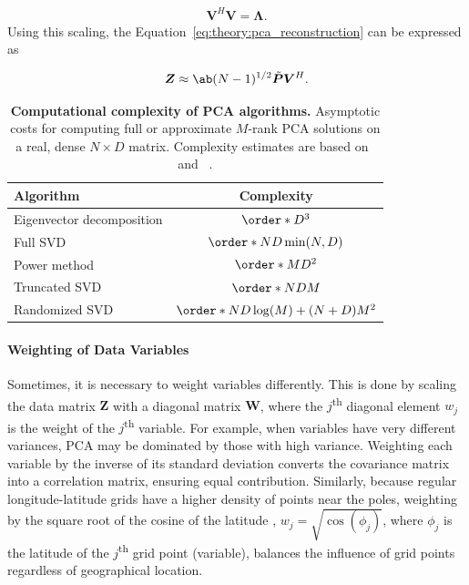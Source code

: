 \begin{align}\label{eq:theory:pca_loadings_non_orthogonal}
    \bm{V}^H \bm{V} = \bm{\Lambda}.
\end{align}
Using this scaling, the Equation~\ref{eq:theory:pca_reconstruction} can be expressed as

\begin{align}\label{eq:theory:pca_reconstruction_loadings}
    \bm{Z} \approx \ab(N-1)^{1/2} \bmn{P} \bm{V}^H.
\end{align}


\begin{table}
    \caption[Computational complexity of PCA algorithms]{\textbf{Computational complexity of PCA algorithms.} Asymptotic costs for computing full or approximate $M$-rank PCA solutions on a real, dense $N\times D$ matrix. Complexity estimates are based on~\citet{bishop_pattern_2006} and ~\citet{halko_finding_2011}.}
    \centering
    \label{tab:pca_algorithm_complexity}
    \begin{tabular}{l c}
        \toprule
        Algorithm & Complexity  \\ 
        \midrule
        Eigenvector decomposition & $\order*{D^3}$ \\
        Full SVD & $\order*{ND\min(N,D)}$ \\
        Power method & $\order*{MD^2}$  \\
        Truncated SVD & $\order*{NDM}$  \\
        Randomized SVD & $\order*{ND \log(M)+(N + D)M^2}$ \\
        \bottomrule
    \end{tabular}
\end{table}


\paragraph{Weighting of Data Variables}

Sometimes, it is necessary to weight variables differently. This is done by scaling the data matrix $\bm{Z}$ with a diagonal matrix $\bm{W}$, where the $j$\textsuperscript{th} diagonal element $w_j$ is the weight of the $j$\textsuperscript{th} variable. For example, when variables have very different variances, PCA may be dominated by those with high variance. Weighting each variable by the inverse of its standard deviation converts the covariance matrix into a correlation matrix, ensuring equal contribution. Similarly, because regular longitude-latitude grids have a higher density of points near the poles, weighting by the square root of the cosine of the latitude \cite{north_latitude_1982}, $w_j = \sqrt{\cos(\phi_j)}$, where $\phi_j$ is the latitude of the $j$\textsuperscript{th} grid point (variable), balances the influence of grid points regardless of geographical location. 

